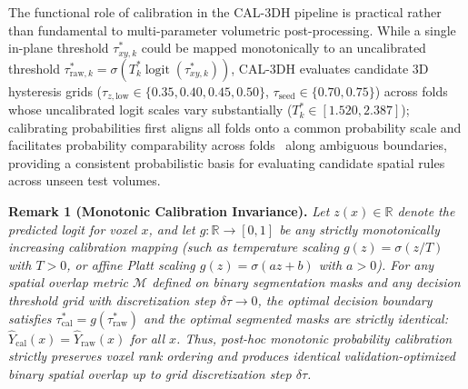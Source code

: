 \documentclass[11pt,a4paper]{article}
\begin{document}
The functional role of calibration in the CAL-3DH pipeline is practical rather than fundamental to multi-parameter volumetric post-processing. While a single in-plane threshold $\tau_{xy,k}^*$ could be mapped monotonically to an uncalibrated threshold $\tau_{\text{raw},k}^* = \sigma(T_k^* \operatorname{logit}(\tau_{xy,k}^*))$, CAL-3DH evaluates candidate 3D hysteresis grids ($\tau_{z,\mathrm{low}} \in \{0.35, 0.40, 0.45, 0.50\}$, $\tau_{\mathrm{seed}} \in \{0.70, 0.75\}$) across folds whose uncalibrated logit scales vary substantially ($T_k^* \in [1.520, 2.387]$); calibrating probabilities first aligns all folds onto a common probability scale and facilitates probability comparability across folds~\cite{guo2017calibration,mukhoti2020calibrating,jungo2019assessing} along ambiguous boundaries, providing a consistent probabilistic basis for evaluating candidate spatial rules across unseen test volumes.


\noindent\textbf{Remark 1 (Monotonic Calibration Invariance).}
\textit{Let $z(x) \in \mathbb{R}$ denote the predicted logit for voxel $x$, and let $g: \mathbb{R} \to [0, 1]$ be any strictly monotonically increasing calibration mapping (such as temperature scaling $g(z) = \sigma(z/T)$ with $T > 0$, or affine Platt scaling $g(z) = \sigma(az+b)$ with $a > 0$). For any spatial overlap metric $\mathcal{M}$ defined on binary segmentation masks and any decision threshold grid with discretization step $\delta\tau \to 0$, the optimal decision boundary satisfies $\tau_{\text{cal}}^* = g(\tau_{\text{raw}}^*)$ and the optimal segmented masks are strictly identical: $\hat{Y}_{\text{cal}}(x) = \hat{Y}_{\text{raw}}(x)$ for all $x$. Thus, post-hoc monotonic probability calibration strictly preserves voxel rank ordering and produces identical validation-optimized binary spatial overlap up to grid discretization step $\delta\tau$.}
\end{document}
